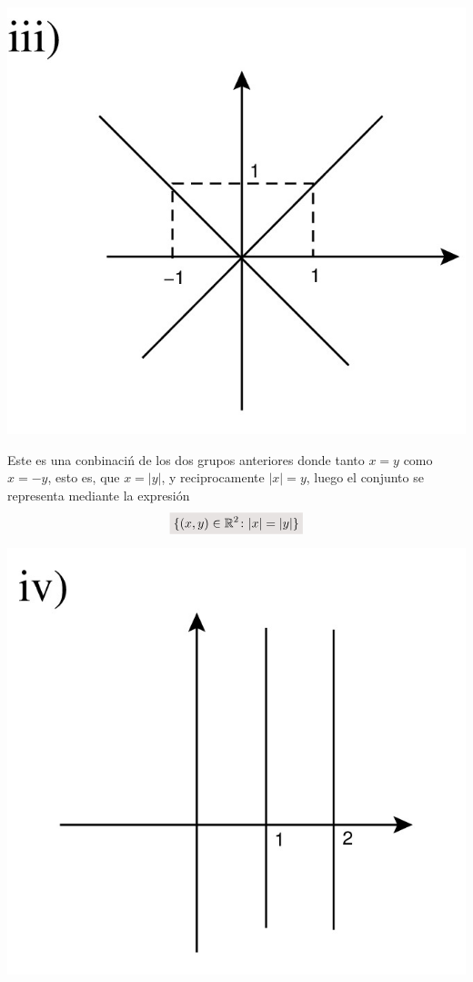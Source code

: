 \documentclass[a4paper,10pt]{article}
\newcommand{\real}{\mathbb{R}}
\newcommand{\resalta}[1]{\colorbox{g}{$\displaystyle #1$}}
\begin{document}
\begin{enumerate}
\begin{enumerate}[label = \roman*)]
\begin{minipage}[c]{0.3\linewidth}
                    \includegraphics[scale=0.15]{4ii-3}
            \end{minipage}
            \begin{minipage}[c]{0.7\linewidth}
                Este es una conbinaci\'n de los dos grupos anteriores donde tanto $x=y$ como $x=-y$, esto es, que $x=|y|$, y reciprocamente $|x|=y$, luego el conjunto se representa mediante la expresi\'on
                \begin{equation}
                    \notag \resalta{\{(x,y)\in \real^{2} \colon |x|=|y|\}}
                \end{equation}
            \end{minipage}
            \begin{minipage}[c]{0.3\linewidth}
                \centering
                    \includegraphics[scale=0.15]{4ii-4}

\end{minipage}
\end{enumerate}
\end{enumerate}
\end{document}
